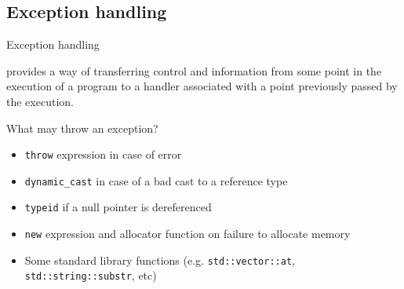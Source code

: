 
\subsection{Exception handling}

\begin{frame}{Exception handling}{}
  \begin{definition}
     provides a way of transferring control and information from some point in the execution of a program to a handler associated with a point previously passed by the execution.
  \end{definition}

  \begin{block}{What may throw an exception?}
    \begin{itemize}
    \item
      \lstinline!throw! expression in case of error
    \item
      \lstinline!dynamic_cast! in case of a bad cast to a reference type
    \item
      \lstinline!typeid! if a null pointer is dereferenced
    \item
      \lstinline!new! expression and allocator function on failure to allocate memory
    \item
      Some standard library functions (e.g. \lstinline!std::vector::at!, \lstinline!std::string::substr!, etc)
    \end{itemize}
  \end{block}
\end{frame}


